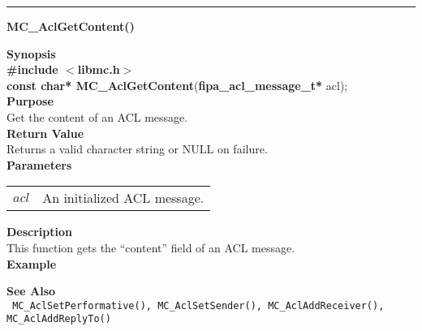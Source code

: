 \noindent
\vspace{5pt}
\rule{6.5in}{0.015in}
\noindent
{}
{\LARGE \bf MC\_AclGetContent()}\\
\label{api:MC_Acl_GetContent()}

\noindent
{\bf Synopsis}\\
{\bf \#include $<$libmc.h$>$}\\
{\bf const char* MC\_AclGetContent}({\bf fipa\_acl\_message\_t*} acl);\\

\noindent
{\bf Purpose}\\
Get the content of an ACL message.\\

\noindent
{\bf Return Value}\\
Returns a valid character string or NULL on failure. \\

\noindent
{\bf Parameters}
\vspace{-0.1in}
\begin{description}
\item
\begin{tabular}{p{10 mm}p{145 mm}} 
$acl$ & An initialized ACL message. \\
\end{tabular}
\end{description}

\noindent
{\bf Description}\\
This function gets the ``content'' field of an ACL message. \\

\noindent
{\bf Example}\\
\noindent
{\footnotesize}

\noindent
{\bf See Also}\\
\texttt{
  MC\_AclSetPerformative(), MC\_AclSetSender(), MC\_AclAddReceiver(), 
    \linebreak MC\_AclAddReplyTo()
}

